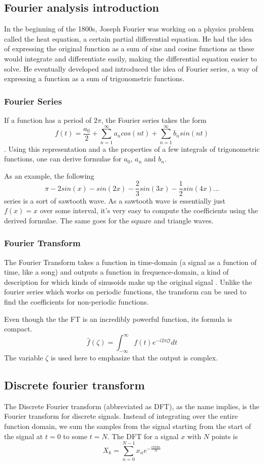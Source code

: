 
\subsection{Fourier analysis introduction}
In the beginning of the 1800s, Joseph Fourier was working on a physics problem called the heat equation, a certain partial differential equation. He had the idea of expressing the original function as a sum of sine and cosine functions as these would integrate and differentiate easily, making the differential equation easier to solve. He eventually developed and introduced the idea of Fourier series, a way of expressing a function as a sum of trigonometric functions. 
\subsubsection{Fourier Series}
If a function has a period of $2\pi$, the Fourier series takes the form $$f(t) = \frac{a_0}{2} + \sum_{n=1}^{\infty}a_ncos(nt)+\sum_{n=1}^{\infty}b_nsin(nt)$$. Using this representation and a the properties of a few integrals of trigonometric functions, one can derive formulae for $a_0$, $a_n$ and $b_n$.

As an example, the following $$\pi -2sin(x) -sin(2x) -\frac{2}{3}sin(3x) -\frac{1}{2}sin(4x) ... $$ series is a sort of sawtooth wave. As a sawtooth wave is essentially just $f(x) = x$ over some interval, it's very easy to compute the coefficients using the derived formulae. The same goes for the square and triangle waves.
 
\subsubsection{Fourier Transform}
The Fourier Transform takes a function in time-domain (a signal as a function of time, like a song) and outputs a function in frequence-domain, a kind of description for which kinds of sinusoids make up the original signal \cite{SimonXu2015}. Unlike the fourier series which works on periodic functions, the transform can be used to find the coefficients for non-periodic functions.

Even though the the FT is an incredibly powerful function, its formula is compact. 
$$\hat{f}(\zeta) = \int_{-\infty}^{\infty} f(t)e^{-i2\pi\zeta t} dt$$
The variable $\zeta$ is used here to emphasize that the output is complex.
\subsection{Discrete fourier transform}
The Discrete Fourier transform (abbreviated as DFT), as the name implies, is the Fourier transform for discrete signals. Instead of integrating over the entire function domain, we sum the samples from the signal starting from the start of the signal at $t=0$ to some $t=N$. The DFT for a signal $x$ with $N$ points is 
$$X_k = \sum_{n=0}^{N-1} x_ne^{-\frac{i2\pi kn}{N}}$$
